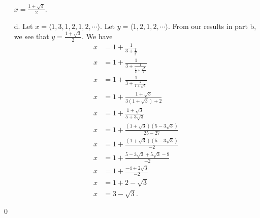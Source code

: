 \documentclass[12 pt]{amsart}
\begin{document}
\begin{enumerate}
      $x = \frac{1 + \sqrt{3}}{2}$.
		\item[d.]
      Let $x = \langle 1,3,1,2,1,2, \cdots \rangle$.
      Let $y = \langle 1,2,1,2, \cdots \rangle$.
      From our results in part b, we see that 
      $y = \frac{1 + \sqrt{3}}{2}$.
      We have
      \begin{align*}
        x &= 1 + \frac{1}{3 + \frac{1}{y}} \\
        x &= 1 
             + \frac
                {1}
                {3 + \frac
                        {1}
                        {\frac
                           {1}
                           {2}
                         + \frac
                             {\sqrt{3}}
                             {2}
                        }
                } \\
        x &= 1 
             + \frac
                {1}
                {3 + \frac
                        {2}
                        {1 + \sqrt{3}}
                } \\
        x &= 1 
             + \frac
                {1 + \sqrt{3}}
                {3(1 + \sqrt{3}) + 2} \\
        x &= 1 
             + \frac
                {1 + \sqrt{3}}
                {5 + 3 \sqrt{3}} \\
        x &= 1 
             + \frac
             {(1 + \sqrt{3})(5 - 3 \sqrt{3})}
                {25 - 27} \\
        x &= 1 
             + \frac
             {(1 + \sqrt{3})(5 - 3 \sqrt{3})}{-2} \\
        x &= 1 + \frac{5 - 3 \sqrt{3} + 5 \sqrt{3} - 9}{-2}  \\
        x &= 1 + \frac{-4 + 2 \sqrt{3}}{-2}  \\
        x &= 1 + 2 - \sqrt{3}  \\
        x &= 3 - \sqrt{3}.
      \end{align*}
	\end{enumerate}
  \qed
\vfill
\newpage
\end{document}
